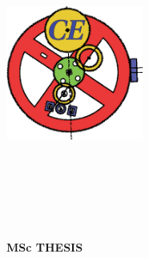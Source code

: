 
\addtolength{\topmargin}{0.95in}

\vspace*{-6.5cm}  \hspace*{-2.2cm}
\parbox[h]{17.8cm}{

\parbox[t]{4.3cm}{\hspace{-0.8cm}\includegraphics[width=4.5cm]{0_template/fig/CE_conv.png}}
\hspace{-0.5cm}
\parbox[b]{6cm}{\centering{\large \bf \LAB}
\\ \LABADD \\ {\bf \WEB}
\\\vspace{1.9cm}}\hfill
\parbox[b]{1.5cm}{\raggedleft{\textcolor{red}{\bf \large
\the\year}}\\\vspace{3.9cm}}
}

\hspace*{-2.8cm}
\vspace*{-0.2cm}
\parbox[h]{17.9cm}{
	\begin{center}
	\Huge{\bf MSc THESIS} \\
	\vspace*{-0.5cm}
	\textcolor{blue}{\vrule width 17.9cm height 3pt} \\
	\huge{\bf \TITLE}
	\end{center}
}

